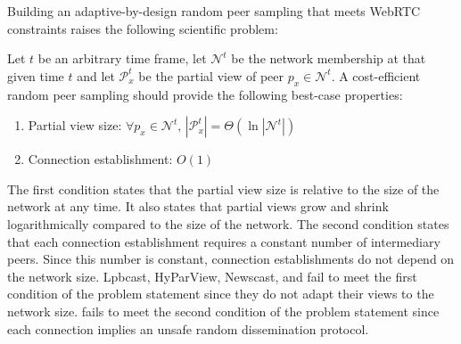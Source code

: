 Building an adaptive-by-design random peer sampling that meets WebRTC
constraints raises the following scientific problem:
\begin{problem}
  Let $t$ be an arbitrary time frame, let $\mathcal{N}^t$ be the network
  membership at that given time $t$ and let $\mathcal{P}_x^t$ be the partial
  view of peer $p_x \in \mathcal{N}^t$.  A cost-efficient random peer sampling
  should provide the following best-case properties:
  \begin{enumerate}
  \item Partial view size: \hfill
    $\forall p_x \in \mathcal{N}^t,\, |\mathcal{P}_x^t| = \Theta (\ln
    |\mathcal{N}^t|)$      
  \item Connection establishment: \hfill $O(1)$
  \end{enumerate}
\end{problem}

The first condition states that the partial view size is relative to the size
of the network at any time. It also states that partial views grow and shrink
logarithmically compared to the size of the network. The second condition
states that each connection establishment requires a constant number of
intermediary peers. Since this number is constant, connection establishments
do not depend on the network size.
Lpbcast, HyParView, Newscast, and \CYCLON fail to meet the first condition of
the problem statement since they do not adapt their views to the network
size. \SCAMP fails to meet the second condition of the problem statement since
each connection implies an unsafe random dissemination protocol.

